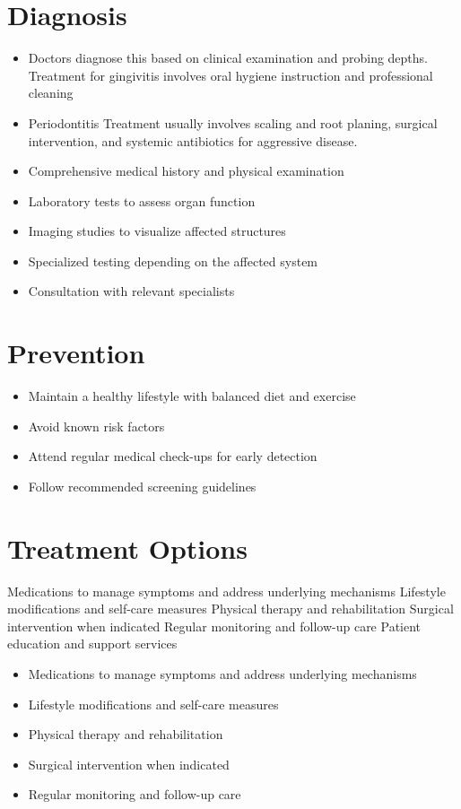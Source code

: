 \section{Diagnosis}
\begin{itemize}[noitemsep]
  \item Doctors diagnose this based on clinical examination and probing depths. Treatment for gingivitis involves oral hygiene instruction and professional cleaning
  \item Periodontitis Treatment usually involves scaling and root planing, surgical intervention, and systemic antibiotics for aggressive disease.
  \item Comprehensive medical history and physical examination
  \item Laboratory tests to assess organ function
  \item Imaging studies to visualize affected structures
  \item Specialized testing depending on the affected system
  \item Consultation with relevant specialists
\end{itemize}
\section{Prevention}
\begin{itemize}[noitemsep]
  \item Maintain a healthy lifestyle with balanced diet and exercise
  \item Avoid known risk factors
  \item Attend regular medical check-ups for early detection
  \item Follow recommended screening guidelines
\end{itemize}
\section{Treatment Options}
Medications to manage symptoms and address underlying mechanisms Lifestyle modifications and self-care measures Physical therapy and rehabilitation Surgical intervention when indicated Regular monitoring and follow-up care Patient education and support services

\begin{itemize}[noitemsep]
  \item Medications to manage symptoms and address underlying mechanisms
  \item Lifestyle modifications and self-care measures
  \item Physical therapy and rehabilitation
  \item Surgical intervention when indicated
  \item Regular monitoring and follow-up care
\end{itemize}
